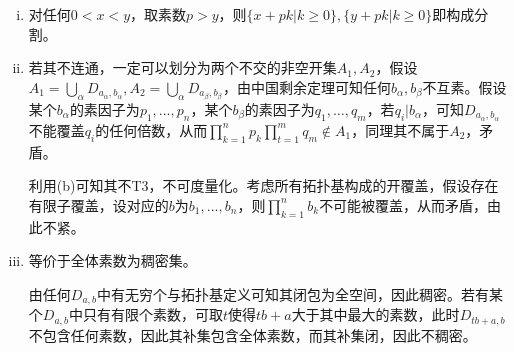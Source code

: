 \documentclass[a4paper,UTF8,fontset=windows]{ctexart}
\begin{document}
\begin{enumerate}[(1)]
\begin{enumerate}[(a)]
\begin{enumerate}[(i)]
    \item
    对任何$0<x<y$，取素数$p>y$，则$\{x+pk|k\ge0\},\{y+pk|k\ge0\}$即构成分割。
    
    \item
    若其不连通，一定可以划分为两个不交的非空开集$A_1,A_2$，假设$A_1=\bigcup_\alpha D_{a_\alpha,b_\alpha},A_2=\bigcup_\alpha D_{a_\beta,b_\beta}$，由中国剩余定理可知任何$b_\alpha,b_\beta$不互素。假设某个$b_\alpha$的素因子为$p_1,\dots,p_n$，某个$b_\beta$的素因子为$q_1,\dots,q_m$，若$q_i|b_\alpha$，可知$D_{a_\alpha,b_\alpha}$不能覆盖$q_i$的任何倍数，从而$\prod_{k=1}^np_k\prod_{t=1}^mq_m\notin A_1$，同理其不属于$A_2$，矛盾。
    
    利用(b)可知其不T3，不可度量化。考虑所有拓扑基构成的开覆盖，假设存在有限子覆盖，设对应的$b$为$b_1,\dots,b_n$，则$\prod_{k=1}^nb_k$不可能被覆盖，从而矛盾，由此不紧。
    
    \item
    等价于全体素数为稠密集。
    
    由任何$D_{a,b}$中有无穷个与拓扑基定义可知其闭包为全空间，因此稠密。若有某个$D_{a,b}$中只有有限个素数，可取$t$使得$tb+a$大于其中最大的素数，此时$D_{tb+a,b}$不包含任何素数，因此其补集包含全体素数，而其补集闭，因此不稠密。
    \end{enumerate}
    \end{enumerate}
\end{enumerate}
\end{document}
